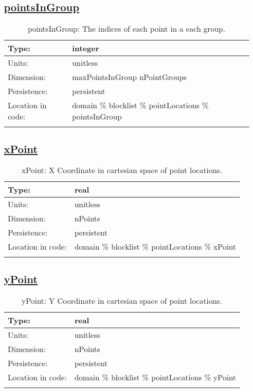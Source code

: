 \subsection[pointsInGroup]{\hyperref[sec:var_tab_pointLocations]{pointsInGroup}}
\label{subsec:var_sec_pointLocations_pointsInGroup}
\begin{center}
\begin{longtable}{| p{2.0in} | p{4.0in} |}
        \hline 
        Type: & integer \\
        \hline 
        Units: & \si{unitless} \\
        \hline 
        Dimension: & maxPointsInGroup nPointGroups \\
        \hline 
        Persistence: & persistent \\
        \hline 
         Location in code: & domain \% blocklist \% pointLocations \% pointsInGroup \\
         \hline 
    \caption{pointsInGroup: The indices of each point in a each group.}
\end{longtable}
\end{center}
\subsection[xPoint]{\hyperref[sec:var_tab_pointLocations]{xPoint}}
\label{subsec:var_sec_pointLocations_xPoint}
\begin{center}
\begin{longtable}{| p{2.0in} | p{4.0in} |}
        \hline 
        Type: & real \\
        \hline 
        Units: & \si{unitless} \\
        \hline 
        Dimension: & nPoints \\
        \hline 
        Persistence: & persistent \\
        \hline 
         Location in code: & domain \% blocklist \% pointLocations \% xPoint \\
         \hline 
    \caption{xPoint: X Coordinate in cartesian space of point locations.}
\end{longtable}
\end{center}
\subsection[yPoint]{\hyperref[sec:var_tab_pointLocations]{yPoint}}
\label{subsec:var_sec_pointLocations_yPoint}
\begin{center}
\begin{longtable}{| p{2.0in} | p{4.0in} |}
        \hline 
        Type: & real \\
        \hline 
        Units: & \si{unitless} \\
        \hline 
        Dimension: & nPoints \\
        \hline 
        Persistence: & persistent \\
        \hline 
         Location in code: & domain \% blocklist \% pointLocations \% yPoint \\
         \hline 
    \caption{yPoint: Y Coordinate in cartesian space of point locations.}
\end{longtable}
\end{center}
